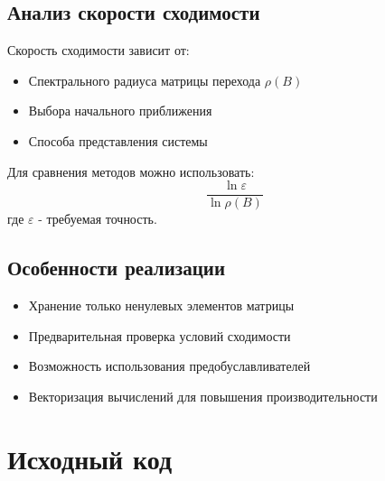 \subsection*{Анализ скорости сходимости}
Скорость сходимости зависит от:
\begin{itemize}
\item Спектрального радиуса матрицы перехода $\rho(B)$
\item Выбора начального приближения
\item Способа представления системы
\end{itemize}

Для сравнения методов можно использовать:
\begin{equation}
\frac{\ln \varepsilon}{\ln \rho(B)}
\end{equation}
где $\varepsilon$ - требуемая точность.

\subsection*{Особенности реализации}
\begin{itemize}
\item Хранение только ненулевых элементов матрицы
\item Предварительная проверка условий сходимости
\item Возможность использования предобуславливателей
\item Векторизация вычислений для повышения производительности
\end{itemize}

\section*{Исходный код}

